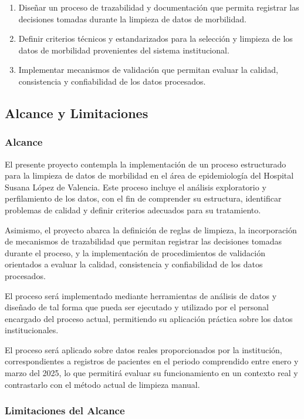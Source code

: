 \documentclass[12pt, letterpaper, oneside]{article}
\begin{document}
\begin{enumerate}[label=\arabic*.]
  \item Diseñar un proceso de trazabilidad y documentación que permita registrar las decisiones tomadas durante la limpieza de datos de morbilidad.
  \item Definir criterios técnicos y estandarizados para la selección y limpieza de los datos de morbilidad provenientes del sistema institucional.
  \item Implementar mecanismos de validación que permitan evaluar la calidad, consistencia y confiabilidad de los datos procesados.
\end{enumerate}

\subsection{Alcance y Limitaciones}

\subsubsection{Alcance}

El presente proyecto contempla la implementación de un proceso estructurado para la limpieza de datos de morbilidad en el área de epidemiología del Hospital Susana López de Valencia. Este proceso incluye el análisis exploratorio y perfilamiento de los datos, con el fin de comprender su estructura, identificar problemas de calidad y definir criterios adecuados para su tratamiento.

Asimismo, el proyecto abarca la definición de reglas de limpieza, la incorporación de mecanismos de trazabilidad que permitan registrar las decisiones tomadas durante el proceso, y la implementación de procedimientos de validación orientados a evaluar la calidad, consistencia y confiabilidad de los datos procesados.

El proceso será implementado mediante herramientas de análisis de datos y diseñado de tal forma que pueda ser ejecutado y utilizado por el personal encargado del proceso actual, permitiendo su aplicación práctica sobre los datos institucionales.

El proceso será aplicado sobre datos reales proporcionados por la institución, correspondientes a registros de pacientes en el periodo comprendido entre enero y marzo del 2025, lo que permitirá evaluar su funcionamiento en un contexto real y contrastarlo con el método actual de limpieza manual.

\subsubsection{Limitaciones del Alcance}
\end{document}
